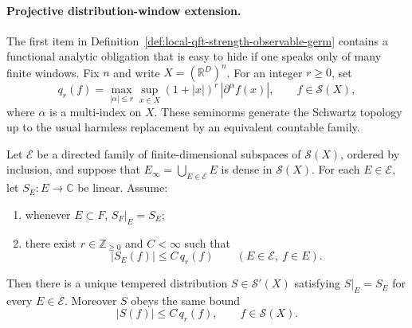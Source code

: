 \paragraph{Projective distribution-window extension.}
The first item in
Definition~\ref{def:local-qft-strength-observable-germ} contains a functional
analytic obligation that is easy to hide if one speaks only of many finite
windows.  Fix \(n\) and write
\(X=(\mathbb R^D)^n\).  For an integer \(r\geq0\), set
\begin{equation}
  q_r(f)
  =
  \max_{|\alpha|\leq r}\sup_{x\in X}
  (1+|x|)^r\,|\partial^\alpha f(x)|,
  \qquad
  f\in\mathcal S(X),
  \label{eq:rg-schwartz-seminorm-window}
\end{equation}
where \(\alpha\) is a multi-index on \(X\).  These seminorms generate the
Schwartz topology up to the usual harmless replacement by an equivalent
countable family.

\begin{lemma}
\label{lem:rg-projective-window-extension-distribution}
Let \(\mathcal E\) be a directed family of finite-dimensional subspaces of
\(\mathcal S(X)\), ordered by inclusion, and suppose that
\(E_\infty=\bigcup_{E\in\mathcal E}E\) is dense in
\(\mathcal S(X)\).  For each \(E\in\mathcal E\), let
\(S_E:E\to\mathbb C\) be linear.  Assume:
\begin{enumerate}
  \item whenever \(E\subset F\), \(S_F|_E=S_E\);
  \item there exist \(r\in\mathbb Z_{\geq0}\) and \(C<\infty\) such that
  \begin{equation}
    |S_E(f)|\leq C\,q_r(f)
    \qquad
    (E\in\mathcal E,\ f\in E).
    \label{eq:rg-projective-window-uniform-bound}
  \end{equation}
\end{enumerate}
Then there is a unique tempered distribution
\(S\in\mathcal S'(X)\) satisfying \(S|_E=S_E\) for every
\(E\in\mathcal E\).  Moreover \(S\) obeys the same bound
\[
  |S(f)|\leq C\,q_r(f),
  \qquad f\in\mathcal S(X).
\]
\end{lemma}

